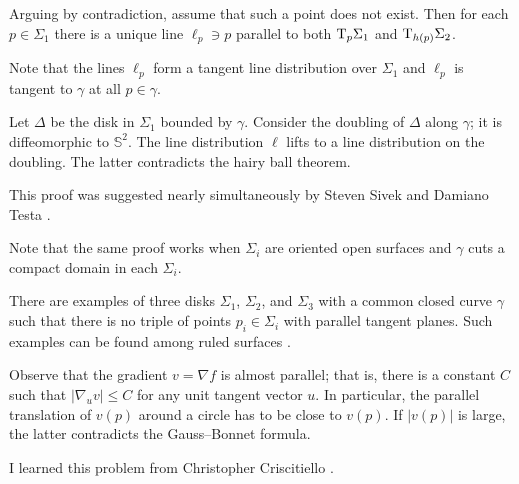 \medskip

Arguing by contradiction,
assume that such a point does not exist.
Then for each $p\in\Sigma_1$
there is a unique line $\ell_p\ni p$ 
 parallel to both $\mathrm{T}_{p} \Sigma_1$ and $\mathrm{T}_{h(p)} \Sigma_2$.

Note that the lines $\ell_p$ form a tangent line distribution over $\Sigma_1$
and $\ell_p$ is tangent to $\gamma$ at all $p\in\gamma$.

Let $\Delta$ be the disk in $\Sigma_1$ bounded by $\gamma$.
Consider the doubling of $\Delta$ along  $\gamma$;
it is diffeomorphic to $\mathbb S^2$.
The line distribution $\ell$ lifts to a line distribution on the doubling.
The latter contradicts the hairy ball theorem.\qeds


This proof was suggested nearly simultaneously 
by Steven Sivek 
and Damiano Testa \cite{two-disks}.

Note that the same proof works when $\Sigma_i$ are oriented open surfaces and $\gamma$ cuts a compact domain in each $\Sigma_i$.

There are examples of three disks $\Sigma_1$, $\Sigma_2$, and $\Sigma_3$
with a common closed curve $\gamma$ such that there is
no triple of points $p_i\in\Sigma_i$ with parallel tangent planes.
Such examples can be found among ruled surfaces \cite{three-disks}.

Observe that the gradient $v=\nabla f$ is almost parallel;
that is, there is a constant $C$ such that $|\nabla_u v|\le C$ for any unit tangent vector $u$.
In particular, the parallel translation of $v(p)$ around a circle has to be close to $v(p)$.
If $|v(p)|$ is large, the latter contradicts the Gauss--Bonnet formula.

\medskip

I learned this problem from Christopher Criscitiello \cite{ccriscitiello}.
